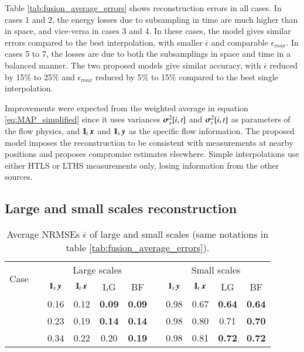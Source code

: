 Table \ref{tab:fusion_average_errors} shows reconstruction errors in all cases. In cases 1 and 2, the energy losses due to subsampling in time are much higher than in space, and vice-versa in cases 3 and 4. In these cases, the model gives similar errors compared to the best interpolation, with smaller $ \overline{\epsilon} $ and comparable $ \epsilon_{max} $. In cases 5 to 7, the losses are due to both the subsamplings in space and time in a balanced manner. The two proposed models give similar accuracy, with $ \overline{\epsilon} $ reduced by 15$ \% $ to 25$ \% $ and $ \epsilon_{max} $ reduced by 5$ \% $ to 15$ \% $ compared to the best single interpolation. 
 
Improvements were expected from the weighted average in equation \ref{eq:MAP_simplified} since it uses variances $ \operatorname{\boldsymbol{\sigma}}^2_s[i,t] $ and $\operatorname{\boldsymbol{\sigma}}^2_t[i,t] $ as parameters of the flow physics, and $ \Interp_t\x  $ and $ \Interp_s\y  $ as the specific flow information. The proposed model imposes the reconstruction to be consistent with measurements at nearby positions and proposes compromise estimates elsewhere. Simple interpolations use either HTLS or LTHS measurements only, losing information from the other sources.

\subsection{Large and small scales reconstruction}
\label{subsubsec:large_and_small_scales_reconstruction}
\begin{table}
\centering
\caption{\label{tab:results_largescales}
Average NRMSEs $ \overline{\epsilon} $ of large and small scales (same notations in table \ref{tab:fusion_average_errors}).}
\vspace{.5cm}
	\begin{tabular}{ccccccccccc} 
		\toprule \multirow{2}{*}{Case}&\multicolumn{1}{c}{}&\multicolumn{4}{c}{Large scales}&\multicolumn{1}{c}{}&\multicolumn{4}{c}{Small scales}\\
		\cmidrule{3-6} \cmidrule{8-11}
		 & & {$\Interp_s\y $} & {$\Interp_t\x $} & {LG} & {BF} & & {$\Interp_s\y $} & {$\Interp_t\x $} & {LG} & {BF}\\
		\midrule
		\myrowcolour
		5 & & 0.16 & 0.12 & {\textbf{0.09}} & {\textbf{0.09}} & & 0.98 & 0.67 & {\textbf{0.64}} & {\textbf{0.64}}\\
		\myrowcolour
		6 & & 0.23 & 0.19 & {\textbf{0.14}} & {\textbf{0.14}} & & 0.98 & 0.80 & {0.71} & {\textbf{0.70}}\\
		\myrowcolour
		7 & & 0.34 & 0.22 & {0.20} & {\textbf{0.19}} & & 0.98 & 0.81 &  {\textbf{0.72}} &  {\textbf{0.72}}\\
		\bottomrule
	\end{tabular}
\end{table}

